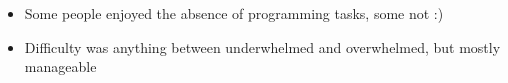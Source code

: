 \begin{frame}{\LectureFeedbackExercisesTitle}
  \begin{itemize}
  \item Some people enjoyed the absence of programming tasks, some not :)
    \vspace{0.5cm}
  \item Difficulty was anything between underwhelmed and overwhelmed, but mostly manageable
  \end{itemize}
\end{frame}
